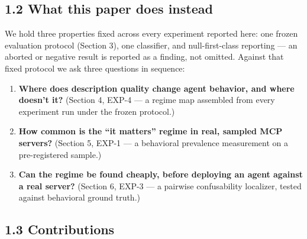 \hypertarget{what-this-paper-does-instead}{%
\subsection{1.2 What this paper does
instead}\label{what-this-paper-does-instead}}

We hold three properties fixed across every experiment reported here:
one frozen evaluation protocol (Section 3), one classifier, and
null-first-class reporting --- an aborted or negative result is reported
as a finding, not omitted. Against that fixed protocol we ask three
questions in sequence:

\begin{enumerate}
\def\labelenumi{\arabic{enumi}.}
\tightlist
\item
  \textbf{Where does description quality change agent behavior, and
  where doesn't it?} (Section 4, EXP-4 --- a regime map assembled from
  every experiment run under the frozen protocol.)
\item
  \textbf{How common is the ``it matters'' regime in real, sampled MCP
  servers?} (Section 5, EXP-1 --- a behavioral prevalence measurement on
  a pre-registered sample.)
\item
  \textbf{Can the regime be found cheaply, before deploying an agent
  against a real server?} (Section 6, EXP-3 --- a pairwise confusability
  localizer, tested against behavioral ground truth.)
\end{enumerate}

\hypertarget{contributions}{%
\subsection{1.3 Contributions}\label{contributions}}

